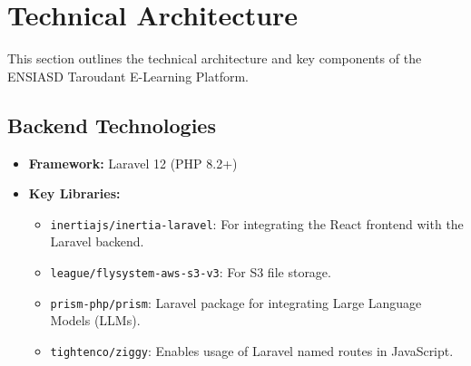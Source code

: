 \documentclass[12pt,a4paper]{article}
\begin{document}
\section{Technical Architecture}

This section outlines the technical architecture and key components of the ENSIASD Taroudant E-Learning Platform.

\subsection{Backend Technologies}
\begin{itemize}
    \item \textbf{Framework:} Laravel 12 (PHP 8.2+)
    \item \textbf{Key Libraries:}
    \begin{itemize}
        \item \texttt{inertiajs/inertia-laravel}: For integrating the React frontend with the Laravel backend.
        \item \texttt{league/flysystem-aws-s3-v3}: For S3 file storage.
        \item \texttt{prism-php/prism}: Laravel package for integrating Large Language Models (LLMs).
        \item \texttt{tightenco/ziggy}: Enables usage of Laravel named routes in JavaScript.
    \end{itemize}
\end{itemize}
\end{document}

